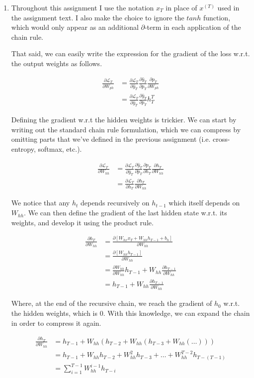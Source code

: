 \documentclass{article}
\newcommand{\del}[2]{\ensuremath{\frac{\partial #1}{\partial #2}}}
\newcommand{\Ell}{\ensuremath{\mathcal{L}}}
\begin{document}
\begin{enumerate}[label=\textbf{1.\arabic*}]
  \item
  Throughout this assignment I use the notation $x_T$ in place of $x^{(T)}$ used in the assignment text. I also make the choice to ignore the $tanh$ function, which would only appear as an additional $\partial$-term in each application of the chain rule.

  That said, we can easily write the expression for the gradient of the loss w.r.t. the output weights as follows.

  \begin{align*}
    \del{\Ell_T}{W_{ph}} &= \del{\Ell_T}{\hat{y}_T} \del{\hat{y}_T}{p_T} \del{p_T}{W_{ph}} \\
    &= \del{\Ell_T}{\hat{y}_T} \del{\hat{y}_T}{p_T} h_T^T
  \end{align*}

  Defining the gradient w.r.t the hidden weights is trickier. We can start by writing out the standard chain rule formulation, which we can compress by omitting parts that we've defined in the previous assignment (i.e. cross-entropy, softmax, etc.).

  \begin{align*}
    \del{\Ell_T}{W_{hh}} &= \del{\Ell_T}{\hat{y}_T} \del{\hat{y}_T}{p_T} \del{p_T}{h_T} \del{h_T}{W_{hh}} \\
    &= \del{\Ell_T}{h_T} \del{h_T}{W_{hh}}
  \end{align*}

  We notice that any $h_t$ depends recursively on $h_{t-1}$ which itself depends on $W_{hh}$. We can then define the gradient of the last hidden state w.r.t. its weights, and develop it using the product rule.

  \begin{align*}
    \del{h_T}{W_{hh}} &= \del{\left[ W_{hx} x_T + W_{hh} h_{T-1} + b_h \right]}{W_{hh}} \\
    &= \del{\left[ W_{hh} h_{T-1} \right]}{W_{hh}} \\
    &= \del{W_{hh}}{W_{hh}} h_{T-1} + W_{hh} \del{h_{T-1}}{W_{hh}} \\
    &= h_{T-1} + W_{hh} \del{h_{T-1}}{W_{hh}}
  \end{align*}

  Where, at the end of the recursive chain, we reach the gradient of $h_0$ w.r.t. the hidden weights, which is $0$. With this knowledge, we can expand the chain in order to compress it again.

  \begin{align*}
    \del{h_T}{W_{hh}} &= h_{T-1} + W_{hh} \left( h_{T-2} + W_{hh} \left( h_{T-3} + W_{hh} \left( \dots \right) \right) \right) \\
    &= h_{T-1} + W_{hh} h_{T-2} + W_{hh}^2 h_{T-3} + \dots + W_{hh}^{T-2} h_{T-(T-1)} \\
    &= \sum_{i=1}^{T-1} W_{hh}^{i-1} h_{T-i}
  \end{align*}


\end{enumerate}
\end{document}
